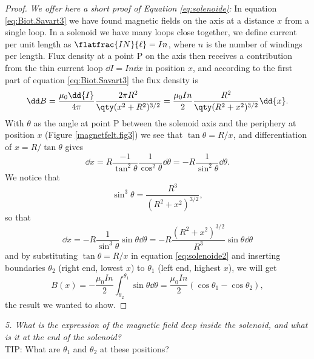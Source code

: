 \documentclass[../Elmag-labhefte-2020.tex]{subfiles}
\begin{document}
\begin{proof}
  \emph{We offer here a short proof of Equation \eqref{eq:solenoide}:} In equation \eqref{eq:Biot.Savart3} we have found magnetic fields on the axis at a distance $x$ from a single loop. In a solenoid we have many loops close together, we define current per unit length as $\flatfrac{I N}{\ell} = I n$, where $n$ is the number of windings per length. Flux density at a point P on the axis then receives a contribution from the thin current loop $\dd{I} = I n \dd{x}$ in position $x$, and according to the first part of equation \eqref{eq:Biot.Savart3} the flux density is 
  \begin{equation}
    \dd B 
    = \frac{\mu_0 \dd{I}}{4 \pi} \frac{2\pi R^2}{\qty(x^2 + R^2)^{3/2}}
    = \frac{\mu_0 I n}{2}  \frac{R^2}{ \qty( R^2 + x^2)^{3/2}} \dd{x} .
    \label{eq:solenoide2}
  \end{equation}
  With $\theta$ as the angle at point P between the solenoid axis and the periphery at position $x$ (Figure \ref{magnetfelt.fig3}) we see that $\tan \theta = R / x$, and differentiation of $x = R / \tan \theta$ gives
  \begin{equation}
    \dd{x} 
    = R \frac{-1}{\tan^2 \theta} \frac{1}{\cos^2\theta} \dd{\theta} 
    = -R \frac{1}{\sin^2\theta} \dd{\theta} .
  \end{equation}
  We notice that
  \begin{equation}
    \sin^3 \theta = \frac{R^3}{(R^2 + x^2)^{3/2}},
  \end{equation}
  so that
  \begin{equation}
    \dd{x} 
    = -R \frac{1}{\sin^3\theta} \sin\theta \dd{\theta}
    = -R \frac{(R^2 + x^2)^{3/2}}{R^3} \sin\theta \dd{\theta}
  \end{equation}
  and by substituting $\tan \theta = R / x$ in equation \eqref{eq:solenoide2} and inserting boundaries $\theta_2$ (right end, lowest $x$) to $\theta_1$ (left end, highest $x$), we will get
  \begin{equation}
    B(x) 
    = -\frac{\mu_0 I n}{2} \int_{\theta_2}^{\theta_1} \sin \theta \dd{\theta}
    = \frac{\mu_0 I n}{2} (\cos \theta_1 - \cos \theta_2),
    \label{eq:solenoide3}
  \end{equation}
  the result we wanted to show.
\end{proof}

\emph{ 5. What is the expression of the magnetic field deep inside the solenoid, and what is it at the end of the solenoid?}
\\
TIP: What are $\theta_1$ and $\theta_2$ at these positions?
\end{document}
